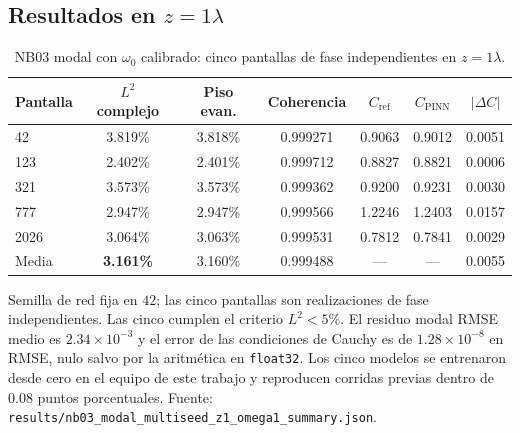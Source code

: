\subsection{Resultados en \texorpdfstring{$z=1\lambda$}{z=1 lambda}}
\label{sec:nb03_resultados_z1}

\begin{table}[htbp]
\centering
\begin{threeparttable}
\caption{NB03 modal con $\omega_0$ calibrado: cinco pantallas de fase independientes en $z=1\lambda$.}
\label{tab:nb03_cinco}
\begin{tabular}{lcccccc}
\toprule
Pantalla & $L^2$ complejo & Piso evan. & Coherencia & $C_\text{ref}$ & $C_\text{PINN}$ & $|\Delta C|$ \\
\midrule
42   & 3.819\% & 3.818\% & 0.999271 & 0.9063 & 0.9012 & 0.0051 \\
123  & 2.402\% & 2.401\% & 0.999712 & 0.8827 & 0.8821 & 0.0006 \\
321  & 3.573\% & 3.573\% & 0.999362 & 0.9200 & 0.9231 & 0.0030 \\
777  & 2.947\% & 2.947\% & 0.999566 & 1.2246 & 1.2403 & 0.0157 \\
2026 & 3.064\% & 3.063\% & 0.999531 & 0.7812 & 0.7841 & 0.0029 \\
\midrule
Media & \textbf{3.161\%} & 3.160\% & 0.999488 & --- & --- & 0.0055 \\
\bottomrule
\end{tabular}
\begin{tablenotes}\small
    \item Semilla de red fija en $42$; las cinco pantallas son realizaciones de
    fase independientes. Las cinco cumplen el criterio $L^2<5\%$. El residuo
    modal RMSE medio es $2.34\times10^{-3}$ y el error de las condiciones de
    Cauchy es de $1.28\times10^{-8}$ en RMSE, nulo salvo por la aritmética en
    \texttt{float32}. Los cinco modelos se entrenaron desde cero en el
    equipo de este trabajo y reproducen corridas previas dentro de $0.08$ puntos
    porcentuales. Fuente:
    \texttt{results/nb03\_modal\_multiseed\_z1\_omega1\_summary.json}.
\end{tablenotes}
\end{threeparttable}
\end{table}


